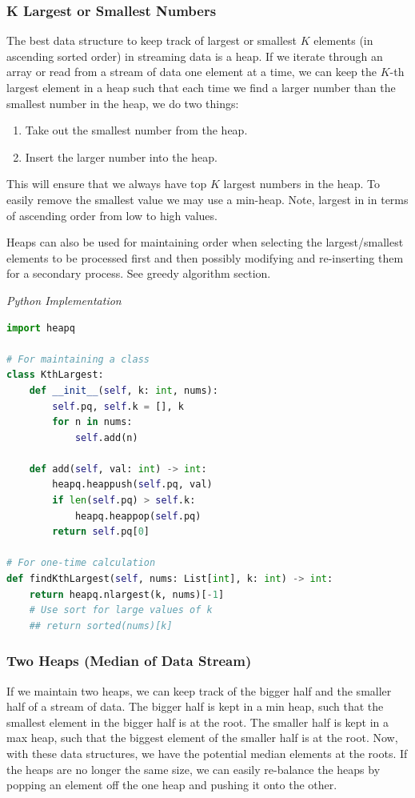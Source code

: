 \documentclass{article}
\begin{document}
    \subsubsection{K Largest or Smallest Numbers}
    The best data structure to keep track of largest or smallest $K$ elements (in ascending sorted order) in streaming data is a heap. If we iterate through an array or read from a stream of data one element at a time, we can keep the $K$-th largest element in a heap such that each time we find a larger number than the smallest number in the heap, we do two things:
    \begin{enumerate}
        \item Take out the smallest number from the heap.
        \item Insert the larger number into the heap.
    \end{enumerate}
    This will ensure that we always have top $K$ largest numbers in the heap. To easily remove the smallest value we may use a min-heap. Note, largest in in terms of ascending order from low to high values. 
    
    Heaps can also be used for maintaining order when selecting the largest/smallest elements to be processed first and then possibly modifying and re-inserting them for a secondary process. See greedy algorithm section.

\vspace{8pt} \emph{Python Implementation}
\begin{lstlisting}[language=Python]
import heapq

# For maintaining a class
class KthLargest:
    def __init__(self, k: int, nums):
        self.pq, self.k = [], k
        for n in nums:
            self.add(n)

    def add(self, val: int) -> int:
        heapq.heappush(self.pq, val)
        if len(self.pq) > self.k:
            heapq.heappop(self.pq)
        return self.pq[0]

# For one-time calculation
def findKthLargest(self, nums: List[int], k: int) -> int:
    return heapq.nlargest(k, nums)[-1]
    # Use sort for large values of k
    ## return sorted(nums)[k]
\end{lstlisting}

    \subsubsection{Two Heaps (Median of Data Stream)}
    If we maintain two heaps, we can keep track of the bigger half and the smaller half of a stream of data. The bigger half is kept in a min heap, such that the smallest element in the bigger half is at the root. The smaller half is kept in a max heap, such that the biggest element of the smaller half is at the root. Now, with these data structures, we have the potential median elements at the roots. If the heaps are no longer the same size, we can easily re-balance the heaps by popping an element off the one heap and pushing it onto the other.
\end{document}
